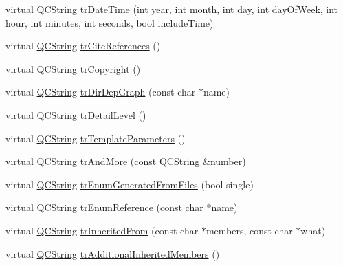 \begin{DoxyCompactItemize}
\item 
virtual \mbox{\hyperlink{class_q_c_string}{Q\+C\+String}} \mbox{\hyperlink{class_translator_croatian_ab0b72227f89c1eacf7add3ddb4af4dc9}{tr\+Date\+Time}} (int year, int month, int day, int day\+Of\+Week, int hour, int minutes, int seconds, bool include\+Time)
\item 
virtual \mbox{\hyperlink{class_q_c_string}{Q\+C\+String}} \mbox{\hyperlink{class_translator_croatian_ac1c1497f155e733a23d30ce572300759}{tr\+Cite\+References}} ()
\item 
virtual \mbox{\hyperlink{class_q_c_string}{Q\+C\+String}} \mbox{\hyperlink{class_translator_croatian_a3551539c8ac3b746f1c771870b984587}{tr\+Copyright}} ()
\item 
virtual \mbox{\hyperlink{class_q_c_string}{Q\+C\+String}} \mbox{\hyperlink{class_translator_croatian_a96c6dffa8db6ee66e1fda8234d78f3de}{tr\+Dir\+Dep\+Graph}} (const char $\ast$name)
\item 
virtual \mbox{\hyperlink{class_q_c_string}{Q\+C\+String}} \mbox{\hyperlink{class_translator_croatian_a8c51d43d261f6bdac4ad89305a51439e}{tr\+Detail\+Level}} ()
\item 
virtual \mbox{\hyperlink{class_q_c_string}{Q\+C\+String}} \mbox{\hyperlink{class_translator_croatian_aeab4867516f03a2920bb07afa909403b}{tr\+Template\+Parameters}} ()
\item 
virtual \mbox{\hyperlink{class_q_c_string}{Q\+C\+String}} \mbox{\hyperlink{class_translator_croatian_aef0e197da4aafbb941a5ba5a43ebcd21}{tr\+And\+More}} (const \mbox{\hyperlink{class_q_c_string}{Q\+C\+String}} \&number)
\item 
virtual \mbox{\hyperlink{class_q_c_string}{Q\+C\+String}} \mbox{\hyperlink{class_translator_croatian_a48747300f884a8e745a45eebb4b70a20}{tr\+Enum\+Generated\+From\+Files}} (bool single)
\item 
virtual \mbox{\hyperlink{class_q_c_string}{Q\+C\+String}} \mbox{\hyperlink{class_translator_croatian_a60cdeaebbcd43e0042ccd1daf99b50fc}{tr\+Enum\+Reference}} (const char $\ast$name)
\item 
virtual \mbox{\hyperlink{class_q_c_string}{Q\+C\+String}} \mbox{\hyperlink{class_translator_croatian_a6276e8ba64d64b3112350b3266341cf4}{tr\+Inherited\+From}} (const char $\ast$members, const char $\ast$what)
\item 
virtual \mbox{\hyperlink{class_q_c_string}{Q\+C\+String}} \mbox{\hyperlink{class_translator_croatian_af21178f49ef1c7763b9505365cc95510}{tr\+Additional\+Inherited\+Members}} ()
\end{DoxyCompactItemize}
